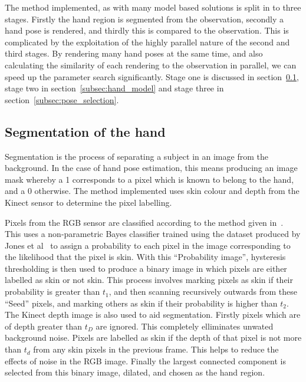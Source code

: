 \documentclass[10pt,a4paper,notitlepage,twocolumn]{report}
\begin{document}
The method implemented, as with many model based solutions is split in to three 
stages.  Firstly the hand region is segmented from the observation, secondly a 
hand pose is rendered, and thirdly this is compared to the observation.  This is 
complicated by the exploitation of the highly parallel nature of the second and 
third stages.  By rendering many hand poses at the same time, and also 
calculating the similarity of each rendering to the observation in parallel, we 
can speed up the parameter search significantly.  Stage one is discussed in 
section~\ref{subsec:segmentation}, stage two in section~\ref{subsec:hand_model} 
and stage three in section~\ref{subsec:pose_selection}.

	\subsection{Segmentation of the hand}
	\label{subsec:segmentation}

	Segmentation is the process of separating a subject in an image from the 
	background.  In the case of hand pose estimation, this means producing an 
	image mask whereby a 1 corresponds to a pixel which is known to belong to the 
	hand, and a 0 otherwise.  The method implemented uses skin colour and depth 
	from the Kinect sensor to determine the pixel labelling.  
  
	Pixels from the RGB sensor are classified according to the method given
	in~\cite{argyros2004real-timetracking}.  This uses a non-parametric Bayes
	classifier trained using the dataset produced by Jones et
	al~\cite{jones2002statisticalcolor} to assign a probability to each pixel in
	the image corresponding to the likelihood that the pixel is skin.  With this
	``Probability image'', hysteresis thresholding is then used to produce a
	binary image in which pixels are either labelled as skin or not skin.  This
	process involves marking pixels as skin if their probability is greater than
	$t_1$, and then scanning recursively outwards from these ``Seed'' pixels, and
	marking others as skin if their probability is higher than $t_2$.  The Kinect
	depth image is also used to aid segmentation.  Firstly pixels which are of
	depth greater than $t_D$ are ignored.  This completely elliminates unwated
	background noise.  Pixels are labelled as skin if the depth of that pixel is
	not more than $t_d$ from any skin pixels in the previous frame.  This helps
	to reduce the effects of noise in the RGB image.  Finally the largest
	connected component is selected from this binary image, dilated, and chosen
	as the hand region.
\end{document}

